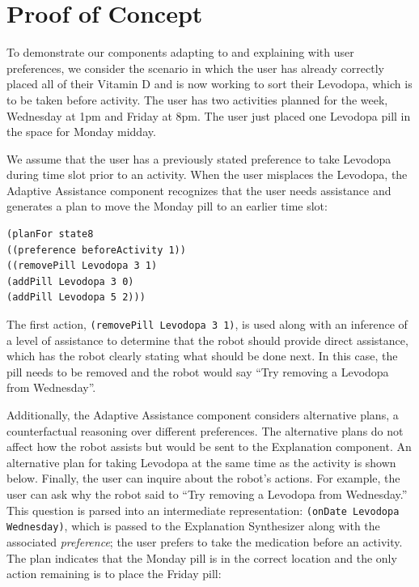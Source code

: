 \documentclass[letterpaper]{article} %
\begin{document}
\section{Proof of Concept}


To demonstrate our components adapting to and explaining with user preferences, we consider the scenario in which the user has already correctly placed all of their Vitamin D and is now working to sort their Levodopa, which is to be taken before activity.  The user has two activities planned for the week, Wednesday at 1pm and Friday at 8pm.  The user just placed one Levodopa pill in the space for Monday midday.

We assume that the user has a previously stated preference to take Levodopa during time slot prior to an activity.  When the user misplaces the Levodopa, the Adaptive Assistance component recognizes that the user needs assistance and generates a plan to
move the Monday pill to an earlier time slot:

\small{
\begin{verbatim}
(planFor state8
((preference beforeActivity 1))
((removePill Levodopa 3 1)
(addPill Levodopa 3 0)
(addPill Levodopa 5 2)))
\end{verbatim}}

The first action, \texttt{(removePill Levodopa 3 1)}, is used along with an inference of a level of assistance to determine that the robot should provide direct assistance, which has the robot clearly stating what should be done next.  In this case, the pill needs to be removed and the robot would say ``Try removing a Levodopa from Wednesday''.

Additionally, the Adaptive Assistance component considers alternative plans, a counterfactual reasoning over different preferences.  The alternative plans do not affect how the robot assists but would be sent to the Explanation component.  An alternative plan for taking Levodopa at the same time as the activity is shown below. Finally, the user can inquire about the robot's actions.  For example, the user can ask why the robot said to ``Try removing a Levodopa from Wednesday.''  This question is parsed into an intermediate representation: \texttt{(onDate Levodopa Wednesday)}, which is passed to the Explanation Synthesizer along with the associated \emph{preference}; the user prefers to take the medication before an activity.
The plan indicates that the Monday pill is in the correct location and the only action remaining is to place the Friday pill:
\end{document}
